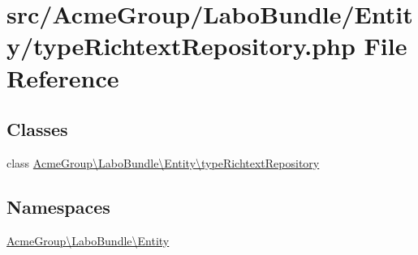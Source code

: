 \hypertarget{type_richtext_repository_8php}{\section{src/\+Acme\+Group/\+Labo\+Bundle/\+Entity/type\+Richtext\+Repository.php File Reference}
\label{type_richtext_repository_8php}
}
\subsection*{Classes}
\begin{DoxyCompactItemize}
\item 
class \hyperlink{class_acme_group_1_1_labo_bundle_1_1_entity_1_1type_richtext_repository}{Acme\+Group\textbackslash{}\+Labo\+Bundle\textbackslash{}\+Entity\textbackslash{}type\+Richtext\+Repository}
\end{DoxyCompactItemize}
\subsection*{Namespaces}
\begin{DoxyCompactItemize}
\item 
 \hyperlink{namespace_acme_group_1_1_labo_bundle_1_1_entity}{Acme\+Group\textbackslash{}\+Labo\+Bundle\textbackslash{}\+Entity}
\end{DoxyCompactItemize}
